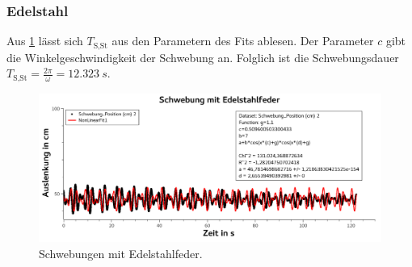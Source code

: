 \documentclass[
	a4paper,
	12pt,
	pagesize,
	ngerman
]{scrartcl}
\begin{document}
	\subsubsection*{Edelstahl}
	Aus \cref{EdelstahlSchwebung} lässt sich $T_\text{S,St}$ aus den Parametern des Fits ablesen. Der Parameter $c$ gibt die Winkelgeschwindigkeit der Schwebung an. Folglich ist die Schwebungsdauer $T_\text{S,St} = \frac{2\pi}{\omega} = \SI{12,323}{s}$.
	\begin{figure}[H]
		\includegraphics[width=1\textwidth]{EdelstahlSchwebung}
		\centering
		\caption{Schwebungen mit Edelstahlfeder.}
		\label{EdelstahlSchwebung}
		\centering
	\end{figure}
\end{document}

